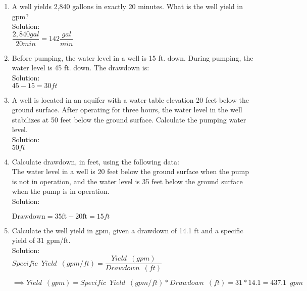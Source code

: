 \begin{enumerate}


\item A well yields 2,840 gallons in exactly 20 minutes. What is the well yield in gpm?\\
Solution:\\
\vspace{0.2cm}
$\dfrac{2,840gal}{20min}=\boxed{142\dfrac{gal}{min}}$


\vspace{0.2cm}
\item Before pumping, the water level in a well is 15 ft. down. During pumping, the water level is 45 ft. down. The drawdown is:\\
Solution:\\
\vspace{0.2cm}
$45-15=\boxed{30 ft}$


\vspace{0.2cm}
\item A well is located in an aquifer with a water table elevation 20 feet below the ground surface. After operating for three hours, the water level in the well stabilizes at 50 feet below the ground surface. Calculate the pumping water level.\\
Solution:\\
\vspace{0.2cm}
$\boxed{50ft}$


\vspace{0.2cm}
\item Calculate drawdown, in feet, using the following data:\\
The water level in a well is 20 feet below the ground surface when the pump is not in operation, and the water level is 35 feet below the ground surface when the pump is in operation.\\
Solution:\\
\vspace{0.2cm}

  $\text {Drawdown} = 35 \mathrm{ft}-20 \mathrm{ft}=\boxed{15ft}$\\


\vspace{0.2cm}
\item Calculate the well yield in gpm, given a drawdown of 14.1 ft and a specific yield of 31 gpm/ft.\\
Solution:\\
\vspace{0.2cm}
  $Specific \enspace Yield \enspace(gpm/ft) =\dfrac{ Yield \enspace(gpm)}{ Drawdown \enspace(ft)}$\\
  \vspace{0.2cm}

  $\implies Yield \enspace(gpm) = Specific \enspace Yield \enspace(gpm/ft)*Drawdown \enspace(ft)=31*14.1=\boxed{437.1 \enspace gpm}$

\end{enumerate}

